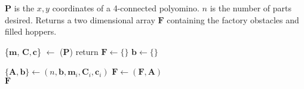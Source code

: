 \begin{algorithm} 
\newcommand\algotext[1]{\end{algorithmic}#1\begin{algorithmic}[1]}
\caption{ ($\mathbf{P}, n$)}
$\mathbf{P}$ is the $x,y$ coordinates of a 4-connected polyomino.  $n$ is the number of parts desired. 
Returns a two dimensional array $ \mathbf{F} $ containing the factory obstacles and filled hoppers.
\begin{algorithmic}[1]
\State \{$\mathbf{m}$, $\mathbf{C}, \mathbf{c}$\} $  \leftarrow$ {}($\mathbf{P}$)
 return
 \EndIf
\State$\mathbf{F} \leftarrow \{\}$  
\State$ \mathbf{b} \leftarrow \{\}$  

\State$\{ \mathbf{A}, \mathbf{b} \}\leftarrow${}$(n,\mathbf{b}, \mathbf{m}_i,\mathbf{C}_i, \mathbf{c}_i)$
\State$ \mathbf{F} \leftarrow${}$(\mathbf{F},\mathbf{A})$
\EndFor \\
\Return  $ \mathbf{F} $
\end{algorithmic}
\end{algorithm} 
 
 
 

 
 
